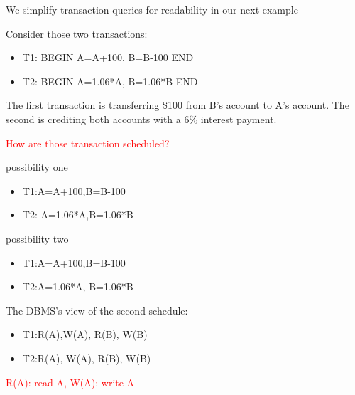 \documentclass{beamer}
\newcommand{\red}[1]{
\textcolor{red}{#1}
}
\begin{document}
\begin{slide}{
\item We simplify transaction queries for readability in our next example  
\pause
\item Consider those two transactions:
\begin{itemize}
	\item T1:	BEGIN   A=A+100,   B=B-100   END
	\item T2:	BEGIN   A=1.06*A,   B=1.06*B   END
	
\end{itemize}
\item The first transaction is transferring \$100 from B’s account to A’s account.  The second is crediting both accounts with a 6\% interest payment.
\item \red{How are those transaction scheduled?}	
}\end{slide}


\begin{slide}{
\item possibility one 
\begin{itemize}
	\item T1:A=A+100,\hspace{2cm}B=B-100   
	\item T2:\hspace{2cm} A=1.06*A,\hspace{2cm}B=1.06*B
\end{itemize}
\item possibility two
\begin{itemize}
	\item T1:A=A+100,\hspace{4cm}B=B-100   
	\item T2:\hspace{2cm}A=1.06*A, B=1.06*B
\end{itemize}
\item The DBMS’s view of the second schedule:
\begin{itemize}
	\item T1:R(A),W(A),\hspace{4cm}   		     	       R(B), W(B)
	\item T2:\hspace{2cm}R(A), W(A), R(B), W(B)
\end{itemize}
\red{R(A): read A, W(A): write A}
}\end{slide}
\end{document}
